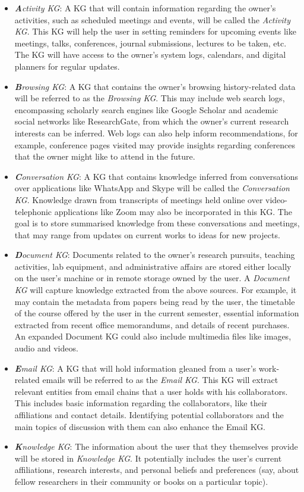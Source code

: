 \documentclass[11pt,pdftex]{article}
\begin{document}
\begin{itemize}
    \item \textit{\textbf{A}ctivity KG}: A KG that will contain information regarding the owner's activities, such as scheduled meetings and events, will be called the \textit{Activity KG}. This KG will help the user in setting reminders for upcoming events like meetings, talks, conferences, journal submissions, lectures to be taken, etc. The KG will have access to the owner's system logs, calendars, and digital planners for regular updates. 
    \item \textit{\textbf{B}rowsing KG}: A KG that contains the owner's browsing history-related data will be referred to as the \textit{Browsing KG}. This may include web search logs, encompassing scholarly search engines like Google Scholar and academic social networks like ResearchGate, from which the owner's current research interests can be inferred. Web logs can also help inform recommendations, for example,  conference pages visited may provide insights regarding conferences that the owner might like to attend in the future.
    \item \textit{\textbf{C}onversation KG}: A KG that contains knowledge inferred from conversations over applications 
    like WhatsApp and Skype will be called the \textit{Conversation KG}. Knowledge drawn from transcripts of meetings held online over video-telephonic applications like Zoom may also be incorporated in this KG. The goal is to store summarised knowledge from these conversations and meetings, that may range from updates on current works to ideas for new projects.
    
    \item \textit{\textbf{D}ocument KG}: Documents related to the owner's research pursuits, teaching activities, lab equipment, and administrative affairs are stored either locally on the user's machine or in remote storage owned by the user. A \textit{Document KG} will capture knowledge extracted from the above sources. For example, it may contain the metadata from papers being read by the user, the timetable of the course offered by the user in the current semester, essential information extracted from recent office memorandums, and details of recent purchases. An expanded Document KG could also include multimedia files like images, audio and videos. 
    
    \item \textit{\textbf{E}mail KG}: A KG that will hold information gleaned from a user's work-related emails will be referred to as the \textit{Email KG}. This KG will extract relevant entities from email chains that a user holds with his collaborators. This includes basic information regarding the collaborators, like their affiliations and contact details. Identifying potential collaborators and the main topics of discussion with them can also enhance the Email KG. 
    \item \textit{\textbf{K}nowledge KG}: The information about the user that they themselves provide will be stored in \textit{Knowledge KG}. It potentially includes the user's current affiliations, research interests, and personal beliefs and preferences (say, about fellow researchers in their community or books on a particular topic). 
  

\end{itemize}
\end{document}
